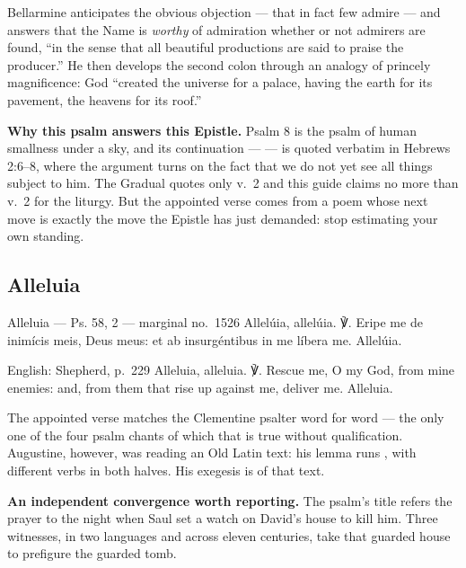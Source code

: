 \begin{witnessnote}
Bellarmine anticipates the obvious objection --- that in fact few admire ---
and answers that the Name is \textit{worthy} of admiration whether or not
admirers are found, ``in the sense that all beautiful productions are said to
praise the producer.'' He then develops the second colon through an analogy of
princely magnificence: God ``created the universe for a palace, having the
earth for its pavement, the heavens for its roof.''
\end{witnessnote}

\textbf{Why this psalm answers this Epistle.} Psalm 8 is the psalm of human
smallness under a sky, and its continuation ---  --- is quoted verbatim in Hebrews 2:6--8, where the argument
turns on the fact that we do not yet see all things subject to him. The
Gradual quotes only v.~2 and this guide claims no more than v.~2 for the
liturgy. But the appointed verse comes from a poem whose next move is exactly
the move the Epistle has just demanded: stop estimating your own standing.

\subsection*{Alleluia }

\begin{appointedlatin}{Alleluia --- Ps. 58, 2 --- marginal no.\ 1526}
Allelúia, allelúia. ℣.  Eripe me de inimícis meis, Deus meus:
et ab insurgéntibus in me líbera me. Allelúia.
\end{appointedlatin}

\begin{namedtranslation}{English: Shepherd, p.~229}
Alleluia, alleluia. ℣. Rescue me, O my God, from mine enemies: and, from them
that rise up against me, deliver me. Alleluia.
\end{namedtranslation}

The appointed verse matches the Clementine psalter word for word --- the only
one of the four psalm chants of which that is true without qualification.
Augustine, however, was reading an Old Latin text: his lemma runs , with
different verbs in both halves. His exegesis is of that text.

\textbf{An independent convergence worth reporting.} The psalm's title
refers the prayer to the night when Saul set a watch on David's house to kill
him. Three witnesses, in two languages and across eleven centuries, take that
guarded house to prefigure the guarded tomb.

